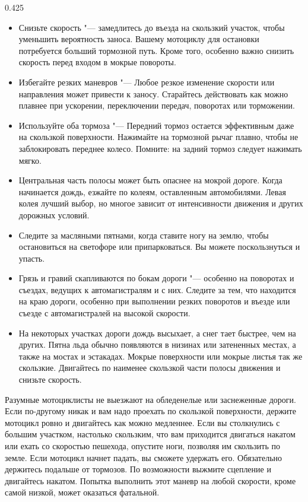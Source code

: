 \begin{langblock}{0.425}
\begin{rus}
		\begin{itemize}[noitemsep]
			\item Снизьте скорость "--- замедлитесь до въезда на скользкий участок, чтобы уменьшить вероятность заноса. Вашему мотоциклу для остановки потребуется больший тормозной путь. Кроме того, особенно важно снизить скорость перед входом в мокрые повороты.
			\item Избегайте резких маневров "--- Любое резкое изменение скорости или направления может привести к заносу. Старайтесь действовать как можно плавнее при ускорении, переключении передач, поворотах или торможении.
			\item Используйте оба тормоза "--- Передний тормоз остается эффективным даже на скользкой поверхности. Нажимайте на тормозной рычаг плавно, чтобы не заблокировать переднее колесо. Помните: на задний тормоз следует нажимать мягко.
			\item Центральная часть полосы может быть опаснее на мокрой дороге. Когда начинается дождь, езжайте по колеям, оставленным автомобилями. Левая колея лучший выбор, но многое зависит от интенсивности движения и других дорожных условий.
			\item Следите за масляными пятнами, когда ставите ногу на землю, чтобы остановиться на светофоре или припарковаться. Вы можете поскользнуться и упасть.
			\item Грязь и гравий скапливаются по бокам дороги "--- особенно на поворотах и съездах, ведущих к автомагистралям и с них. Следите за тем, что находится на краю дороги, особенно при выполнении резких поворотов и въезде или съезде с автомагистралей на высокой скорости.
			\item На некоторых участках дороги дождь высыхает, а снег тает быстрее, чем на других. Пятна льда обычно появляются в низинах или затененных местах, а также на мостах и эстакадах. Мокрые поверхности или мокрые листья так же скользкие. Двигайтесь по наименее скользкой части полосы движения и снизьте скорость.
		\end{itemize}
		
		
		Разумные мотоциклисты не выезжают на обледенелые или заснеженные дороги. Если по-другому никак и вам надо проехать по скользкой поверхности, держите мотоцикл ровно и двигайтесь как можно медленнее. Если вы столкнулись с большим участком, настолько скользким, что вам приходится двигаться накатом или ехать со скоростью пешехода, опустите ноги, позволяя им скользить по земле. Если мотоцикл начнет падать, вы сможете удержать его. Обязательно держитесь подальше от тормозов. По возможности выжмите сцепление и двигайтесь накатом.  Попытка выполнить этот маневр на любой скорости, кроме самой низкой, может оказаться фатальной.
\end{rus}
\end{langblock}


